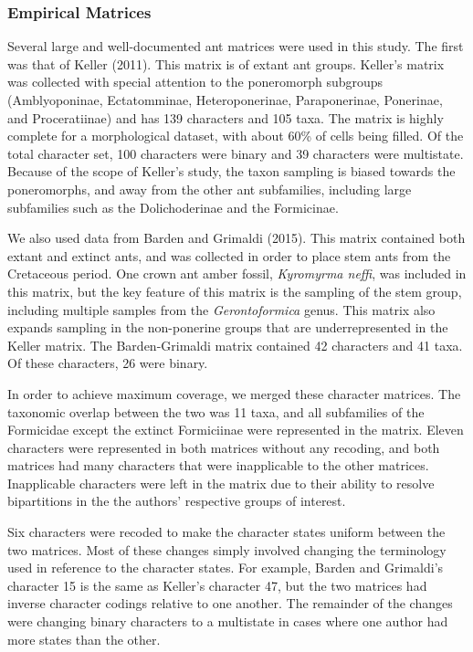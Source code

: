 \documentclass[]{article}
\begin{document}
\subsubsection{Empirical Matrices}
Several large and well-documented ant matrices were used in this study.
The first was that of Keller (2011). 
This matrix is of extant ant groups. 
Keller's matrix was collected with special attention to the poneromorph subgroups (Amblyoponinae, Ectatomminae,
Heteroponerinae, Paraponerinae, Ponerinae, and Proceratiinae) and has 139 characters and 105 taxa.
The matrix is highly complete for a morphological dataset, with about 60\% of cells being filled.
Of the total character set, 100 characters were binary and 39 characters were multistate.
Because of the scope of Keller's study, the taxon sampling is biased towards the poneromorphs, and away from the other ant subfamilies, including large subfamilies such as the Dolichoderinae and the Formicinae. \par
We also used data from Barden and Grimaldi (2015). 
This matrix contained both extant and extinct ants, and was collected in order to place stem ants from the Cretaceous period.
One crown ant amber fossil, \textit{Kyromyrma neffi}, was included in this matrix, but the key feature of this matrix is the sampling of the stem group, including multiple samples from the \textit{Gerontoformica} genus.
This matrix also expands sampling in the non-ponerine groups that are underrepresented in the Keller matrix.
The Barden-Grimaldi matrix contained 42 characters and 41 taxa. 
Of these characters, 26 were binary.\par
In order to achieve maximum coverage, we merged these character matrices.
The taxonomic overlap between the two was 11 taxa, and all subfamilies of the Formicidae except the extinct Formiciinae were represented in the matrix. 
Eleven characters were represented in both matrices without any recoding, and both matrices had many characters that were inapplicable to the other matrices.
Inapplicable characters were left in the matrix due to their ability to resolve bipartitions in the the authors' respective groups of interest. \par
Six characters were recoded to make the character states uniform between the two matrices.
Most of these changes simply involved changing the terminology used in reference to the character states.
For example, Barden and Grimaldi's character 15 is the same as Keller's character 47, but the two matrices had inverse character codings relative to one another.
The remainder of the changes were changing binary characters to a multistate in cases where one author had more states than the other. 
\end{document}
